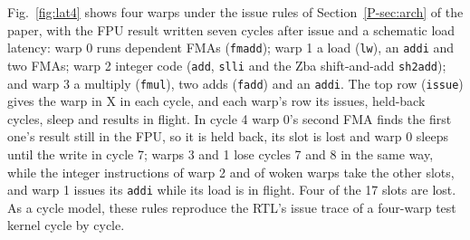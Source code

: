 \documentclass[journal]{IEEEtran}
\begin{document}
Fig.~\ref{fig:lat4} shows four warps under the issue rules of Section~\ref{P-sec:arch} of the paper, with the FPU result written
seven cycles after issue and a schematic load latency: warp 0 runs dependent FMAs
(\texttt{fmadd}); warp 1 a load (\texttt{lw}), an \texttt{addi} and two FMAs; warp 2
integer code (\texttt{add}, \texttt{slli} and the Zba shift-and-add \texttt{sh2add});
and warp 3 a multiply (\texttt{fmul}), two adds (\texttt{fadd}) and an \texttt{addi}.
The top row (\texttt{issue}) gives the warp in X in each cycle, and each warp's row its
issues, held-back cycles, sleep and results in flight. In cycle 4 warp 0's second FMA
finds the first one's result still in the FPU, so it is held back, its slot is lost
and warp 0 sleeps until the write in cycle 7; warps 3 and 1 lose cycles 7 and 8 in the
same way, while the integer instructions of warp 2 and of woken warps take the other
slots, and warp 1 issues its \texttt{addi} while its load is in flight. Four of the 17
slots are lost. As a cycle model, these rules reproduce the RTL's issue trace of a
four-warp test kernel cycle by cycle.
\end{document}

